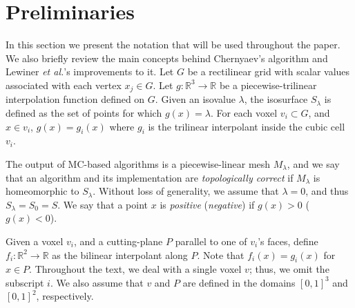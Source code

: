
\section{Preliminaries}
\label{sec:preliminaries}

In this section we present the notation that will be used throughout the paper. We also briefly review the main concepts behind Chernyaev's algorithm and Lewiner \emph{et al.}'s improvements to it. 
%
Let $G$ be a rectilinear grid with scalar values associated with each vertex $x_j \in G$. Let $g:\mathbb{R}^3 \rightarrow \mathbb{R}$ be a piecewise-trilinear interpolation function defined on $G$. Given an isovalue $\lambda$,  the isosurface $S_\lambda$ is defined as the set of points for which $g(x)=\lambda$. For each voxel $v_i \subset G$, and $x \in v_i$, $g(x) = g_i(x)$ where $g_i$ is the trilinear interpolant inside the cubic cell $v_i$. 

The output of MC-based algorithms is a piecewise-linear mesh $M_\lambda$, and we say that an algorithm and its implementation are \emph{topologically correct} if $M_\lambda$ is homeomorphic to $S_\lambda$. Without loss of generality, we assume that $\lambda = 0$, and thus $S_\lambda = S_0 = S$. We say that a point $x$ is \emph{positive} (\emph{negative}) if $g(x) > 0$ ($g(x) < 0$). 

Given a voxel $v_i$, and a cutting-plane $P$ parallel to one of $v_i$'s faces, define  $f_i:\mathbb{R}^2 \rightarrow \mathbb{R}$ as the bilinear interpolant along $P$. Note that $f_i(x) = g_i(x)$ for $x \in P$. Throughout the text, we deal with a single voxel $v$; thus, we omit the subscript $i$. We also assume that $v$ and $P$ are defined in the domains  $[0,1]^3$ and $[0,1]^2$, respectively.

